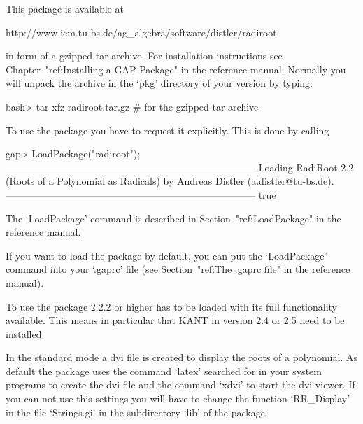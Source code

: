 


This package is available at

\begintt
http://www.icm.tu-bs.de/ag_algebra/software/distler/radiroot
\endtt

in form of a gzipped tar-archive. For installation instructions see
Chapter~"ref:Installing a GAP Package" in the {\GAP} reference manual. 
Normally you will unpack the archive in the `pkg' directory of your
{\GAP} version by typing:

\beginexample
    bash> tar xfz radiroot.tar.gz        # for the gzipped tar-archive
\endexample


To use the {\Radiroot} package you have to request it explicitly. This  is
done by calling

\beginexample
gap> LoadPackage("radiroot");
-----------------------------------------------------------------------------
Loading  RadiRoot 2.2 (Roots of a Polynomial as Radicals)
by Andreas Distler (a.distler@tu-bs.de).
-----------------------------------------------------------------------------
true
\endexample

The `LoadPackage' command is described  in  Section~"ref:LoadPackage"  in
the {\GAP} reference manual.

If you want to load the {\Radiroot} package by default, you  can  put  the
`LoadPackage' command  into  your  `.gaprc'  file  (see  Section~"ref:The
.gaprc file" in the {\GAP} reference manual).


To use {\Radiroot} the package {\Alnuth} 2.2.2 or higher has to be
loaded with its full functionality available. This means in particular
that KANT \cite{KANT} in version 2.4 or 2.5 need to be installed.

In the standard mode a dvi file is created to display the roots of a
polynomial. As default the package uses the command `latex' searched
for in your system programs to create the dvi file and the command
`xdvi' to start the dvi viewer. If you can not use this settings you
will have to change the function `RR_Display' in the file `Strings.gi'
in the subdirectory `lib' of the package.

